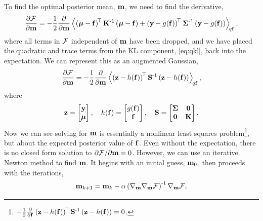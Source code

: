 \documentclass{article} %
\begin{document}
To find the optimal posterior mean, $\pomean$, we need to find the derivative,
\begin{equation}
    \frac{\partial\Fengy}{\partial\pomean} = -\frac{1}{2}
    \frac{\partial}{\partial\pomean} \expec{q\lstate}{
        \brac{\prmean - \lstate}\transpose\prcov\inv
        \brac{\prmean - \lstate}
        + \brac{\obs - \nonlin{\lstate}}\transpose \lcov\inv
            \brac{\obs - \nonlin{\lstate}}},
\end{equation}
where all terms in $\Fengy$ independent of $\pomean$ have been dropped, and we
have placed the quadratic and trace terms from the KL component,
\eqref{eq:qkl}, back into the expectation.
We can represent this as an augmented Gaussian,
\begin{equation}
    \frac{\partial\Fengy}{\partial\pomean} = -\frac{1}{2}
        \frac{\partial}{\partial\pomean}
        \expec{q\lstate}{
        \brac{\augobs - \augnonlin{\lstate}}\transpose\augcov\inv
        \brac{\augobs - \augnonlin{\lstate}}
    },
    \label{eq:augsys}
\end{equation}
where
\begin{equation}
    \augobs = \begin{bmatrix} \obs \\ \prmean \end{bmatrix}, \quad
    \augnonlin{\lstate} = \begin{bmatrix} \nonlin{\lstate} \\ \lstate 
        \end{bmatrix}, \quad
    \augcov = \begin{bmatrix} \lcov & \mathbf{0} \\ \mathbf{0} & \prcov 
        \end{bmatrix}.
\end{equation}
Now we can see solving for $\pomean$ is essentially a nonlinear least squares 
problem\footnote{$-\frac{1}{2}
        \frac{\partial}{\partial\lstate}
        \brac{\augobs - \augnonlin{\lstate}}\transpose\augcov\inv
        \brac{\augobs - \augnonlin{\lstate}} = 0$.}, but about
the expected posterior value of $\lstate$. Even without the expectation, there
is no  closed form solution to $\partial\Fengy/\partial\pomean = 0$.
However, we can use an iterative Newton method to find $\pomean$. It begins
with an initial guess, $\pomean_0$, then proceeds with the iterations,
\begin{equation}
    \pomean_{k+1} = \pomean_k -
    \step\brac{\nabla_\pomean\nabla_\pomean\Fengy}\inv \nabla_\pomean\Fengy,
    \label{eq:newton}
\end{equation}
\end{document}
